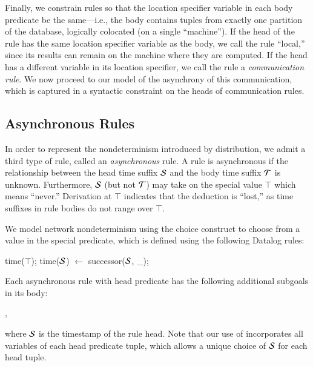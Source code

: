 Finally, we constrain \lang rules so that the location specifier variable in each body predicate be the same---i.e., the body contains tuples from exactly one partition of the database, logically colocated (on a single ``machine'').  If the head of the rule has the same location specifier variable as the body, we call the rule ``local,'' since its results can remain on the machine where they are computed.  If the head has a different variable in its location specifier, we call the rule a {\em communication rule}.  We now proceed to our model of the asynchrony of this communication, which is captured in a syntactic constraint on the heads of communication rules.

\subsection{Asynchronous Rules}

In order to represent the nondeterminism introduced by distribution, we admit a
third type of rule, called an {\em asynchronous} rule.  A rule is asynchronous
if the 
relationship between the head time suffix $\SDedalus$ and the body time suffix $\Tau$ is
unknown.  Furthermore, $\SDedalus$ (but not $\Tau$) may take on the special value
$\top$ which means ``never.''  Derivation at $\top$ indicates that the
deduction is ``lost,'' as time suffixes in rule bodies do not range over
$\top$.

We model network nondeterminism using the choice construct to choose
from a value in the special 
predicate, which is defined using the following Datalog rules:

\begin{Dedalus}
time(\(\top\));
time(\(\SDedalus\)) \(\leftarrow\) successor(\(\SDedalus\), _);
\end{Dedalus}

\noindent
Each asynchronous rule with head predicate  has the following additional subgoals in its
body:

, 

\noindent
where
$\SDedalus$ is the timestamp of the rule head.  Note that our use of  incorporates all variables of each head predicate tuple, which allows a unique choice of $\SDedalus$ for each head tuple.


